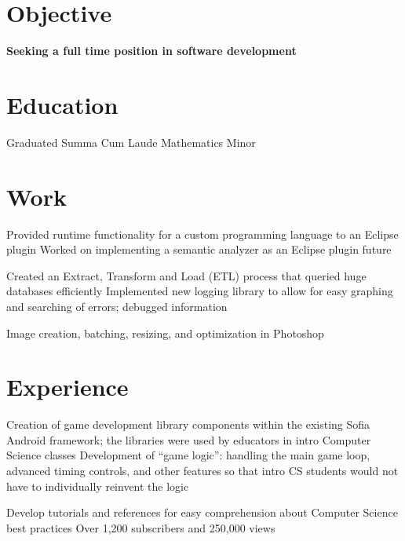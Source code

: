 \documentclass{my_cv}
\begin{document}

\section{Objective}
\workitemsone
{\textbf{Seeking a full time position in software development}}

\section{Education}
\workitemstwo
{Graduated Summa Cum Laude }
{Mathematics Minor}
 
\section{Work}
\workitemstwo
{Provided runtime functionality for a custom programming language to an Eclipse plugin}
{Worked on implementing a semantic analyzer as an Eclipse plugin future}

\workitemstwo
{Created an Extract, Transform and Load (ETL) process that queried huge databases efficiently  }
{Implemented new logging library to allow for easy graphing and searching of errors; debugged information}

\workitemsone
{Image creation, batching, resizing, and optimization in Photoshop}

\section{Experience}
\workitemstwo
{Creation of game development library components within the existing Sofia Android framework; the libraries were used by educators in intro Computer Science classes }
{Development of “game logic”: handling the main game loop, advanced timing controls, and other features so that intro CS students would not have to individually reinvent the logic}

\workitemstwo
{Develop tutorials and references for easy comprehension about Computer Science best practices }
{Over 1,200 subscribers and 250,000 views}
\end{document}
